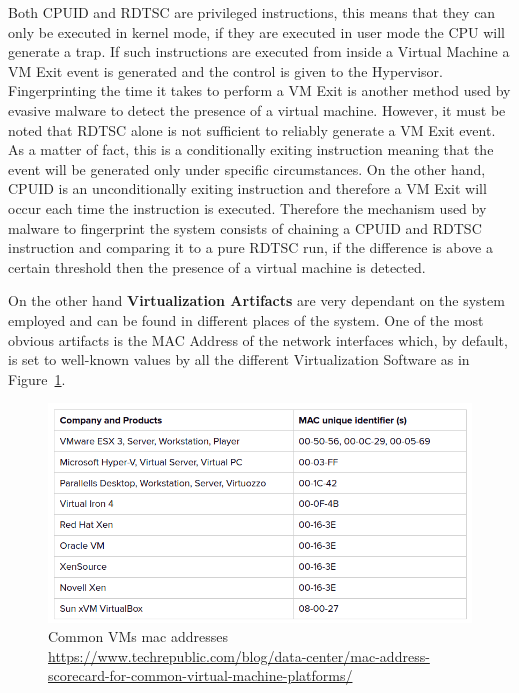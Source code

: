 Both CPUID and RDTSC are privileged instructions, this means that they can only be executed in kernel mode, if they are executed in user mode the CPU will generate a trap. If such instructions are executed from inside a Virtual Machine a VM Exit event is generated and the control is given to the Hypervisor. Fingerprinting the time it takes to perform a VM Exit is another method used by evasive malware to detect the presence of a virtual machine. However, it must be noted that RDTSC alone is not sufficient to reliably generate a VM Exit event. As a matter of fact, this is a conditionally exiting instruction meaning that the event will be generated only under specific circumstances. On the other hand, CPUID is an unconditionally exiting instruction and therefore a VM Exit will occur each time the instruction is executed. Therefore the mechanism used by malware to fingerprint the system consists of chaining a CPUID and RDTSC instruction and comparing it to a pure RDTSC run, if the difference is above a certain threshold then the presence of a virtual machine is detected.

On the other hand \textbf{Virtualization Artifacts} are very dependant on the system employed and can be found in different places of the system. One of the most obvious artifacts is the MAC Address of the network interfaces which, by default, is set to well-known values by all the different Virtualization Software as in Figure~\ref{fig:vms}.

\noindent
\begin{figure}[htp]
\centering
\includegraphics[width=\linewidth]{images/vms-mac-address.png}
\caption{Common VMs mac addresses \newline \url{https://www.techrepublic.com/blog/data-center/mac-address-scorecard-for-common-virtual-machine-platforms/}}
\label{fig:vms}
\end{figure}

